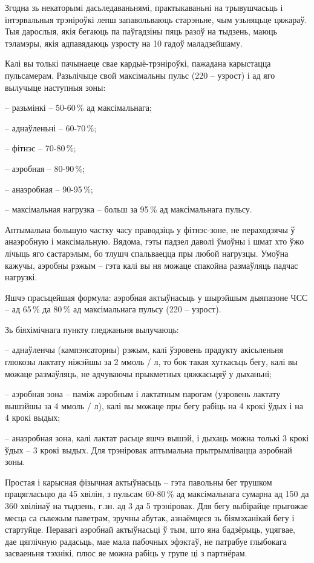 Згодна зь некаторымі дасьледаваньнямі, практыкаваньні на трывушчасьць і інтэрвальныя трэніроўкі лепш запавольваюць старэньне, чым узьняцьце цяжараў. Тыя дарослыя, якія бегаюць па паўгадзіны пяць разоў на тыдзень, маюць тэламэры, якія адпавядаюць узросту на 10 гадоў маладзейшаму.

Калі вы толькі пачынаеце свае кардыё-трэніроўкі, пажадана карыстацца пульсамерам. Разьлічыце свой максімальны пульс (220 – узрост) і ад яго вылучыце наступныя зоны:

– разьмінкі – 50-60\,\% ад максімальнага;

– аднаўленьні – 60-70\,\%;

– фітнэс – 70-80\,\%;

– аэробная – 80-90\,\%;

– анаэробная – 90-95\,\%;

– максімальная нагрузка – больш за 95\,\% ад максімальнага пульсу.

Аптымальна большую частку часу праводзіць у фітнэс-зоне, не пераходзячы ў анаэробную і максімальную. Вядома, гэты падзел даволі ўмоўны і шмат хто ўжо лічыць яго састарэлым, бо тлушч спальваецца пры любой нагрузцы. Умоўна кажучы, аэробны рэжым – гэта калі вы ня можаце спакойна размаўляць падчас нагрузкі.

Яшчэ прасьцейшая формула: аэробная актыўнасьць у шырэйшым дыяпазоне ЧСС – ад 65\,\% да 80\,\% ад максімальнага пульсу (220 – узрост).

Зь біяхімічнага пункту гледжаньня вылучаюць: 

– аднаўленчы (кампэнсаторны) рэжым, калі ўзровень прадукту акісьленьня глюкозы лактату ніжэйшы за 2 ммоль / л, то бок такая хуткасьць бегу, калі вы можаце размаўляць, не адчуваючы прыкметных цяжкасьцяў у дыханьні;

– аэробная зона – паміж аэробным і лактатным парогам (узровень лактату вышэйшы за 4 ммоль / л), калі вы можаце пры бегу рабіць на 4 крокі ўдых і на 4 крокі выдых;

– анаэробная зона, калі лактат расьце яшчэ вышэй, і дыхаць можна толькі 3 крокі ўдых – 3 крокі выдых. Для трэніровак аптымальна прытрымлівацца аэробнай зоны.

Простая і карысная фізычная актыўнасьць – гэта павольны бег трушком працягласьцю да 45 хвілін, з пульсам 60-80\,\% ад максімальнага сумарна ад 150 да 360 хвілінаў на тыдзень, г.зн. ад 3 да 5 трэніровак. Для бегу выбірайце прыгожае месца са сьвежым паветрам, зручны абутак, азнаёмцеся зь біямэханікай бегу і стартуйце. Перавагі аэробнай актыўнасьці ў тым, што яна бадзёрыць, уцягвае, дае цяглічную радасьць, мае мала пабочных эфэктаў, не патрабуе глыбокага засваеньня тэхнікі, плюс яе можна рабіць у групе ці з партнёрам.

